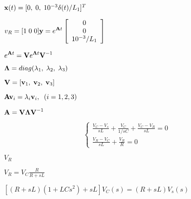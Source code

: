 \documentclass{article}
\def\lthtmlcheckvsize{\ifdim\ht\sizebox<\vsize 
  \ifdim\wd\sizebox<\hsize\expandafter\hfill\fi \expandafter\vfill
  \else\expandafter\vss\fi}%
\begin{document}
{\newpage\clearpage
{}%
$ {\bf x}(t)=[0,\;0,\;10^{-3}\delta(t)/L_1]^T$%
\lthtmlindisplaymathZ
\lthtmlcheckvsize\clearpage}

{\newpage\clearpage
{}%
$\displaystyle v_R=[1\;0\;0]{\bf y}=e^{{\bf A}t}
\left[\begin{array}{c}0\\0\\10^{-3}/L_1\end{array}\right]$%
\lthtmlindisplaymathZ
\lthtmlcheckvsize\clearpage}

{\newpage\clearpage
{}%
$\displaystyle e^{{\bf A}t}={\bf V}e^{{\bf\Lambda}t}{\bf V}^{-1}$%
\lthtmlindisplaymathZ
\lthtmlcheckvsize\clearpage}

{\newpage\clearpage
{}%
$ {\bf\Lambda}=diag(\lambda_1,\;\lambda_2,\;\lambda_3)$%
\lthtmlindisplaymathZ
\lthtmlcheckvsize\clearpage}

{\newpage\clearpage
{}%
$ {\bf V}=[{\bf v}_1,\;{\bf v}_2,\;{\bf v}_3]$%
\lthtmlindisplaymathZ
\lthtmlcheckvsize\clearpage}

{\newpage\clearpage
{}%
$ {\bf Av}_i=\lambda_i{\bf v}_i,\;\;(i=1,2,3)$%
\lthtmlindisplaymathZ
\lthtmlcheckvsize\clearpage}

{\newpage\clearpage
{}%
$ {\bf A}={\bf V\Lambda V}^{-1}$%
\lthtmlindisplaymathZ
\lthtmlcheckvsize\clearpage}

{\newpage\clearpage
{}%
\begin{displaymath}\left\{
\begin{array}{l}
\frac{V_C-V_s}{sL}+\frac{V_C}{1/sC}+\frac{V_C-V_R}{sL}=0\\
\frac{V_R-V_C}{sL}+\frac{V_R}{R}=0
\end{array}\right.\end{displaymath}%
\lthtmldisplayZ
\lthtmlcheckvsize\clearpage}

{\newpage\clearpage
{}%
$ V_R$%
\lthtmlindisplaymathZ
\lthtmlcheckvsize\clearpage}

{\newpage\clearpage
{}%
$\displaystyle V_R=V_C\frac{R}{R+sL}$%
\lthtmlindisplaymathZ
\lthtmlcheckvsize\clearpage}

{\newpage\clearpage
{}%
$\displaystyle [(R+sL)(1+LC s^2)+sL]V_C(s)=(R+sL)V_s(s)$%
\lthtmlindisplaymathZ
\lthtmlcheckvsize\clearpage}
\end{document}
